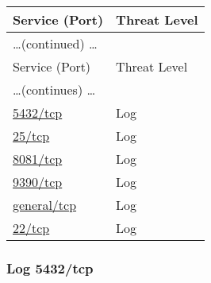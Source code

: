 \documentclass{article}
\begin{document}
\begin{longtable}{|l|l|}
\hline
\rowcolor{gvm_report}Service (Port)&Threat Level\\
\hline
\endfirsthead
\multicolumn{2}{l}{\hfill\ldots (continued) \ldots}\\
\hline
\rowcolor{gvm_report}Service (Port)&Threat Level\\
\hline
\endhead
\hline
\multicolumn{2}{l}{\ldots (continues) \ldots}\\
\endfoot
\hline
\endlastfoot
\hline
\hyperref[port:192.168.178.2 5432/tcp Log]{5432/tcp}&Log\\
\hline
\hyperref[port:192.168.178.2 25/tcp Log]{25/tcp}&Log\\
\hline
\hyperref[port:192.168.178.2 8081/tcp Log]{8081/tcp}&Log\\
\hline
\hyperref[port:192.168.178.2 9390/tcp Log]{9390/tcp}&Log\\
\hline
\hyperref[port:192.168.178.2 general/tcp Log]{general/tcp}&Log\\
\hline
\hyperref[port:192.168.178.2 22/tcp Log]{22/tcp}&Log\\
\hline
\end{longtable}



\subsubsection{Log 5432/tcp}
\label{port:192.168.178.2 5432/tcp Log}
\end{document}
